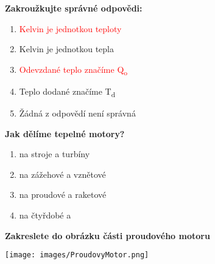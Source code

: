 \documentclass[../main.tex]{subfiles}
\begin{document}
\begin{enumerate}[label={\textbf{\arabic*.}}]
\begin{minipage}{0.45\textwidth}
    \item \textbf{Zakroužkujte správné odpovědi:}
        \begin{enumerate}[label={\alph*)}, itemsep=0pt, topsep=0.15cm]
            \item \textcolor{red}{{Kelvin je jednotkou teploty}}
            \item {Kelvin je jednotkou tepla}
            \item \textcolor{red}{{Odevzdané teplo značíme Q\textsubscript{o}}}
            \item {Teplo dodané značíme T\textsubscript{d}}
            \item {Žádná z odpovědí není správná}
        \end{enumerate}
    
    \item \textbf{Jak dělíme tepelné motory?}
        \begin{enumerate}[label={\alph*)}, itemsep=0pt, topsep=0.15cm]
            \item {}\tecky{2cm} na \tecky{1cm} stroje a \tecky{1cm} turbíny
            \item {}\tecky{2cm} na zážehové a vznětové
            \item {}\tecky{2cm} na proudové a raketové
            \item {}\tecky{2cm} na čtyřdobé a \tecky{2cm}
        \end{enumerate}
\end{minipage}
\hfill
\begin{minipage}[t]{0.4\textwidth}
    \vspace{-12.4cm}

    \item \textbf{Zakreslete do obrázku části proudového motoru}
    
    \vspace{1.25cm}
    \begin{center}
    \texttt{[image: images/ProudovyMotor.png]}
\end{center}
\end{minipage}
\end{enumerate}
\end{document}
